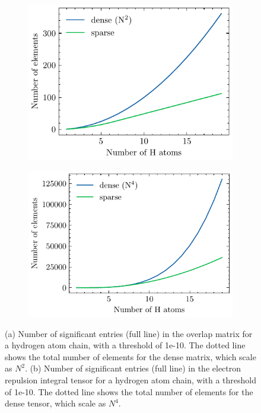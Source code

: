 \begin{figure}[h]
\centering
\begin{subfigure}{0.45\linewidth}
\includegraphics[scale=0.8]{overlap_nze}
\caption{}
\end{subfigure}
\begin{subfigure}{0.45\linewidth}
\includegraphics[scale=0.8]{eri_nze}
\caption{}
\end{subfigure}%
\caption{(a) Number of significant entries (full line) in the overlap matrix for a hydrogen atom chain, with a threshold of 1e-10. The dotted line shows the total number of elements for the dense matrix, which scale as $N^2$. (b) Number of significant entries (full line) in the electron repulsion integral tensor for a hydrogen atom chain, with a threshold of 1e-10. The dotted line shows the total number of elements for the dense tensor, which scale as $N^4$.}
\end{figure}

